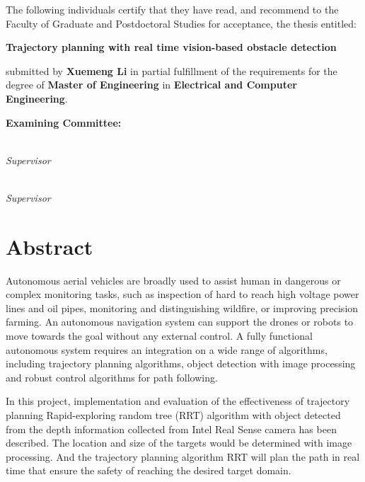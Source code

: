 
\noindent The following individuals certify that they have read,
and recommend to the Faculty of Graduate and Postdoctoral Studies
for acceptance, the thesis entitled:

\begin{center}
{\large \textbf{Trajectory planning with real time vision-based obstacle detection}}
\end{center}

submitted by \textbf{Xuemeng Li} in partial fulfillment of the requirements for the degree of \textbf{Master of Engineering} in \textbf{Electrical and Computer Engineering}.%
\par\bigskip%

\noindent\textbf{Examining Committee:}%
\par\medskip{}\\\emph{Supervisor}
\par\medskip{}\\\emph{Supervisor}
\cleardoublepage

\chapter{Abstract}

Autonomous aerial vehicles are broadly used to assist human in dangerous or complex monitoring tasks, such as inspection of hard to reach high voltage power lines and oil pipes, monitoring and distinguishing wildfire, or improving precision farming. An autonomous navigation system can support the drones or robots to move towards the goal without any external control. A fully functional autonomous system requires an integration on a wide range of algorithms, including trajectory planning algorithms, object detection with image processing and robust control algorithms for path following. 

In this project, implementation and evaluation of the effectiveness of trajectory planning Rapid-exploring random tree (RRT) algorithm with object detected from the depth information collected from Intel Real Sense camera has been described. The location and size of the targets would be determined with image processing. And the trajectory planning algorithm RRT will plan the path in real time that ensure the safety of reaching the desired target domain. 


